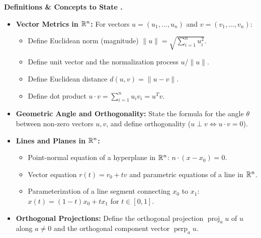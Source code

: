\documentclass{natsirt}
\newcounter{topic}[section]
\newenvironment{recallbox}[1][]{%
    \begin{bluebox}[#1]\refstepcounter{topic}\textbf{Definitions \& Concepts to State \thesection.\thetopic}%
}{\end{bluebox}}
\newcommand{\citem}{\item[$\square$]}
\newcommand{\proj}{\operatorname{proj}}
\begin{document}
\begin{recallbox}
    \begin{itemize}
        \citem \textbf{Vector Metrics in $\mathbb{R}^n$:} For vectors $u = (u_1, \dots, u_n)$ and $v = (v_1, \dots, v_n)$:
        \begin{itemize}
            \item Define Euclidean norm (magnitude) $\|u\| = \sqrt{\sum_{i=1}^n u_i^2}$.
            \item Define unit vector and the normalization process $u / \|u\|$.
            \item Define Euclidean distance $d(u, v) = \|u - v\|$.
            \item Define dot product $u \cdot v = \sum_{i=1}^n u_i v_i = u^T v$.
        \end{itemize}
        \citem \textbf{Geometric Angle and Orthogonality:} State the formula for the angle $\theta$ between non-zero vectors $u, v$, and define orthogonality ($u \perp v \iff u \cdot v = 0$).
        \citem \textbf{Lines and Planes in $\mathbb{R}^n$:}
        \begin{itemize}
            \item Point-normal equation of a hyperplane in $\mathbb{R}^n$: $n \cdot (x - x_0) = 0$.
            \item Vector equation $r(t) = r_0 + t v$ and parametric equations of a line in $\mathbb{R}^n$.
            \item Parameterization of a line segment connecting $x_0$ to $x_1$: $x(t) = (1-t)x_0 + t x_1$ for $t \in [0, 1]$.
        \end{itemize}
        \citem \textbf{Orthogonal Projections:} Define the orthogonal projection $\proj_a u$ of $u$ along $a \neq 0$ and the orthogonal component vector $\operatorname{perp}_a u$.
    \end{itemize}
\end{recallbox}
\end{document}
